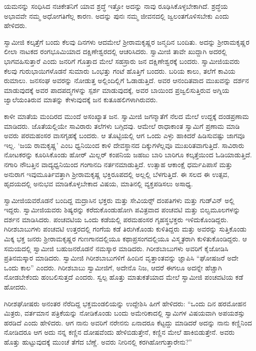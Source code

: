  ಯಮನನ್ನು ಸಂಧಿಸಿದ ನಚಿಕೇತನಿಗೆ ಯಾವ ಶ್ರದ್ಧೆ ಇತ್ತೋ ಅದನ್ನು ನಾವು ರೂಢಿಸಿಕೊಳ್ಳಬೇಕಾಗಿದೆ. ಶ್ರದ್ಧೆಯ ಅಭಾವವೇ ನಮ್ಮ ಅಧೋಗತಿಗೆಲ್ಲ ಕಾರಣ. ಅದನ್ನು ಪುನಃ ನಮ್ಮ ಜೀವನದಲ್ಲಿ ಜ್ವಲಂತಗೊಳಿಸಬೇಕು ಎಂದು ಹೇಳಿದರು. 

 ಸ್ವಾಮೀಜಿ ಕಲ್ಕತ್ತೆಗೆ ಬಂದು ಕೆಲವು ದಿನಗಳು ಆದಮೇಲೆ ಶ‍್ರೀರಾಮಕೃಷ್ಣರ ಜನ್ಮದಿನ ಬಂದಿತು. ಅದನ್ನು ಶ‍್ರೀರಾಮಕೃಷ್ಣರ ಲೀಲಾ ನಾಟಕದ ರಂಗಭೂಮಿಯಾದ ದಕ್ಷಿಣೇಶ್ವರದಲ್ಲಿ ಆಚರಿಸಿದರು. ಸ್ವಾಮೀಜಿ ತಾವೇ ಖುದ್ದಾಗಿ ಅದರಲ್ಲಿ ಭಾಗವಹಿಸುತ್ತಾರೆ ಎಂದು ಜನರಿಗೆ ಗೊತ್ತಾದ ಮೇಲೆ ಸಹಸ್ರಾರು ಜನ ದಕ್ಷಿಣೇಶ್ವರಕ್ಕೆ ಬಂದರು. ಸ್ವಾಮೀಜಿಯವರು ಕೆಲವು ಗುರುಭಾಯಿಗಳೊಡನೆ ಸುಮಾರು ಒಂಭತ್ತು ಗಂಟೆ ಹೊತ್ತಿಗೆ ಬಂದರು. ಬರಿಯ ಕಾಲು, ತಲೆಗೆ ಕಾವಿಯ ರುಮಾಲು. ಜನಸಂಘ ಅವರನ್ನು ನೋಡುತ್ತ ಅಲ್ಲಿಂದಿಲ್ಲಿಗೆ ಓಡಾಡುತ್ತಿದೆ. ಅವರ ಆನಂದಿತವಾದ ಮುಖವನ್ನು ದರ್ಶನ ಮಾಡುವುದಕ್ಕೆ ಅವರ ಪಾದಪದ್ಮಗಳನ್ನು ಸ್ಪರ್ಶ ಮಾಡುವುದಕ್ಕೆ, ಅವರ ಬಾಯಿಂದ ಪ್ರಜ್ವಲಿಸುತ್ತಿರುವ ಅಗ್ನಿಯ ಜ್ವಾಲೆಯಂತಿರುವ ಮಾತನ್ನು ಕೇಳುವುದಕ್ಕೆ ಜನ ಕುತೂಹಲಿಗಳಾಗಿರುವರು. 

 ಕಾಳೀ ಮಾತೆಯ ಮಂದಿರದ ಮುಂದೆ ಅಸಂಖ್ಯಾತ ಜನ. ಸ್ವಾಮೀಜಿ ಜಗನ್ಮಾತೆಗೆ ನೆಲದ ಮೇಲೆ ಉದ್ದಕ್ಕೆ ದಂಡಪ್ರಣಾಮ ಮಾಡಿದರು. ಜೊತೆಯಲ್ಲಿಯೇ ಸಾವಿರಾರು ತಲೆಗಳು ಬಗ್ಗಿದವು. ಆಮೇಲೆ ರಾಧಾಕಾಂತ ಸ್ವಾಮಿಗೆ ಪ್ರಣಾಮ ಮಾಡಿ ಅವರು ಪರಮಹಂಸರ ವಾಸಗೃಹಕ್ಕೆ ಬಂದರು. ಆ ತೊಟ್ಟಿಯಲ್ಲಿ ಆಗ ಒಂದು ಎಳ್ಳು ಹಾಕಿದರೆ ಹಿಡಿಸುವಷ್ಟು ಜಾಗವೂ ಇಲ್ಲ. ‘ಜಯ ರಾಮಕೃಷ್ಣ’ ಎಂಬ ಧ್ವನಿಯಿಂದ ಕಾಳಿ ದೇವಸ್ಥಾನದ ದಿಕ್ಕುಗಳೆಲ್ಲವೂ ಮುಖರಿತವಾಗುತ್ತಿದೆ. ಸಾವಿರಾರು ನೋಟಕರನ್ನು ಕೂರಿಸಿಕೊಂಡು ಹೋರ್ ಮಿಲ್ಲರ್ ಕಂಪನಿಯ ಜಹಜು ಬಾರಿ ಬಾರಿಗೂ ಕಲ್ಕತ್ತೆಯಿಂದ ಓಡಿಯಾಡುತ್ತಿದೆ. ನಗಾರಿ ನೌಬತ್ತಿನ ವಾದ್ಯಧ್ವನಿಯಿಂದ ಗಂಗಾನದಿ ನರ್ತನಮಾಡುತ್ತಿದೆ. ಉತ್ಸಾಹ ಆಕಾಂಕ್ಷೆ ಧರ್ಮಪಿಪಾಸೆ ಮತ್ತು ಅನುರಾಗ ಇವು\break ಮೂರ್ತಿವತ್ತಾಗಿ ಶ‍್ರೀರಾಮಕೃಷ್ಣ ಭಕ್ತಿರೂಪದಲ್ಲಿ ಅಲ್ಲಲ್ಲಿ ಬೆಳಗುತ್ತಿದೆ. ಈ ಸಲದ ಈ ಉತ್ಸವ, ಹೃದಯದಲ್ಲಿ ಅನುಭವ ಮಾಡಿಕೊಳ್ಳಬೇಕಾದ ವಿಷಯ, ಮಾತಿನಲ್ಲಿ ವ್ಯಕ್ತಪಡಿಸಲು ಅಸಾಧ್ಯ. 

 ಸ್ವಾಮೀಜಿಯವರೊಡನೆ ಬಂದಿದ್ದ ಮದ್ರಾಸಿನ ಭಕ್ತರು ಮತ್ತು ಸೇವಿಯರ್ಸ್‍‍ ದಂಪತಿಗಳು ಮತ್ತು ಗುಡ್‍ವಿನ್ ಅಲ್ಲಿ ಇದ್ದರು. ಸ್ವಾಮೀಜಿಯವರು ಶಿಷ್ಯರನ್ನು ಕರೆದುಕೊಂಡುಹೋಗಿ ಪವಿತ್ರವಾದ ಪಂಚವಟಿ ಮತ್ತು ಬಿಲ್ವಮೂಲಗಳನ್ನು ದರ್ಶನ ಮಾಡಿಸಿದರು. ಪಂಚವಟಿಯ ಒಂದು ಕಡೆಯಲ್ಲಿ ಪರಮಹಂಸರ ಗೃಹಸ್ಥಭಕ್ತರು ಇಳಿದುಕೊಂಡಿದ್ದರು. ಗಿರೀಶಬಾಬುಗಳು ಪಂಚವಟಿ ಉತ್ತರದಲ್ಲಿ ಗಂಗೆಯ ಕಡೆ ತಿರುಗಿಕೊಂಡು ಕುಳಿತಿದ್ದರು ಮತ್ತು ಅವರನ್ನು ಸುತ್ತಿಕೊಂಡು ಮಿಕ್ಕ ಭಕ್ತ ಜನರು ಶ‍್ರೀರಾಮಕೃಷ್ಣರ ಗುಣಗಾನದಲ್ಲಿಯೂ ಕಥಾಪ್ರಸಂಗದಲ್ಲಿಯೂ ವಿಸ್ಮೃತರಾಗಿ ಕುಳಿತುಕೊಂಡಿದ್ದರು. ಆ ಸಮಯದಲ್ಲಿ ಸ್ವಾಮೀಜಿ ಬಹುಜನರೊಡನೆ ನಮಸ್ಕಾರ ಮಾಡಿದರು. ಗಿರೀಶಬಾಬುಗಳು ಅವರಿಗೆ ಕೈಜೋಡಿಸಿ ಪ್ರತಿನಮಸ್ಕಾರ ಮಾಡಿದರು. ಸ್ವಾಮೀಜಿ ಗಿರೀಶಬಾಬುಗಳಿಗೆ ಹಿಂದಿನ ವೃತ್ತಾಂತವನ್ನು ಜ್ಞಾಪಿಸಿ “ಘೋಷಜರೆ ಅದೇ ಒಂದು ಕಾಲ” ಎಂದರು. ಗಿರೀಶಬಾಬು ಸ್ವಾಮೀಜಿಗೆ, ಅದೇನೊ ನಿಜ, ಆದರೆ ಈಗಲೂ ಅದನ್ನೇ ಹೆಚ್ಚಾಗಿ ನೋಡಬೇಕೆಂದು ಹಂಬಲಿಸುತ್ತದೆ ಎಂದರು. ಸ್ವಲ್ಪ ಹೊತ್ತು ಮಾತುಕತೆಯಾದ ಮೇಲೆ ಸ್ವಾಮೀಜಿ ಪಂಚವಟಿಯ ಕಡೆ ಹೋದರು. 

 ಗಿರೀಶಘೋಷರು ಅನಂತರ ನೆರೆದಿದ್ದ ಭಕ್ತಮಂಡಲಿಯನ್ನು ಉದ್ದೇಶಿಸಿ ಹೀಗೆ ಹೇಳಿದರು: “ಒಂದು ದಿನ ಹರಮೋಹನ ಮಿತ್ರರು, ವರ್ತಮಾನ ಪತ್ರಿಕೆಯನ್ನು ನೋಡಿಕೊಂಡು ಬಂದು ಅಮೇರಿಕಾದಲ್ಲಿ ಸ್ವಾಮಿಗಳ ವಿಷಯವಾಗಿ ಅಪಯಶಸ್ಸು ಹರಡಿದೆ ಎಂದು ಹೇಳಿದರು. ಆಗ ನಾನು ಅವರಿಗೆ ನರೇನನು ಏನಾದರೂ ಕೆಟ್ಟದ್ದು ಮಾಡಿದರೆ ಅದನ್ನು ನಾನು ಕಣ್ಣಿನಿಂದ ನೋಡಿದರೂ ಆಗ ಅದು ನನ್ನ ಕಣ್ಣಿನ ದೋಷವೆಂದು ಹೇಳಿಬಿಡುತ್ತೇನೆ, ಕಣ್ಣಿನ ಮೇಲೆ ಹಾಕಿಬಿಡುತ್ತೇನೆ. ಅವರು ಹೊತ್ತು ಹುಟ್ಟುವುದಕ್ಕೆ ಮುಂಚೆ ತೆಗೆದ ಬೆಣ್ಣೆ. ಅವರು ನೀರಿನಲ್ಲಿ ಕರಗಿಹೋಗುತ್ತಾರೇನು?” 

